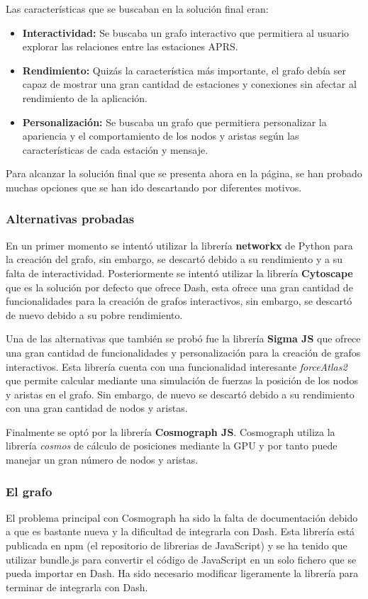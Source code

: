 Las características que se buscaban en la solución final eran:

\begin{itemize}
	\item \textbf{Interactividad:} Se buscaba un grafo interactivo que permitiera al usuario explorar las relaciones entre las estaciones APRS.
	\item \textbf{Rendimiento:} Quizás la característica más importante, el grafo debía ser capaz de mostrar una gran cantidad de estaciones y conexiones sin afectar al rendimiento de la aplicación.
	\item \textbf{Personalización:} Se buscaba un grafo que permitiera personalizar la apariencia y el comportamiento de los nodos y aristas según las características de cada estación y mensaje.
\end{itemize}
Para alcanzar la solución final que se presenta ahora en la página, se han probado muchas opciones que se han ido descartando por diferentes motivos.
\subsubsection{Alternativas probadas}
En un primer momento se intentó utilizar la librería \textbf{networkx} de Python para la creación del grafo, sin embargo, se descartó debido a su rendimiento y a su falta de interactividad. Posteriormente se intentó utilizar la librería \textbf{Cytoscape} que es la solución por defecto que ofrece Dash, esta ofrece una gran cantidad de funcionalidades para la creación de grafos interactivos, sin embargo, se descartó de nuevo debido a su pobre rendimiento.

Una de las alternativas que también se probó fue la librería \textbf{Sigma JS} que ofrece una gran cantidad de funcionalidades y personalización para la creación de grafos interactivos. Esta librería cuenta con una funcionalidad interesante \textit{forceAtlas2} que permite calcular mediante una simulación de fuerzas la posición de los nodos y aristas en el grafo. Sin embargo, de nuevo se descartó debido a su rendimiento con una gran cantidad de nodos y aristas.

Finalmente se optó por la librería \textbf{Cosmograph JS}. Cosmograph utiliza la librería \textit{cosmos} de cálculo de posiciones mediante la GPU y por tanto puede manejar un gran número de nodos y aristas.

\subsubsection{El grafo}
El problema principal con Cosmograph ha sido la falta de documentación debido a que es bastante nueva y la dificultad de integrarla con Dash. Esta librería está publicada en npm (el repositorio de librerias de JavaScript) y se ha tenido que utilizar bundle.js para convertir el código de JavaScript en un solo fichero que se pueda importar en Dash. Ha sido necesario modificar ligeramente la librería para terminar de integrarla con Dash.

